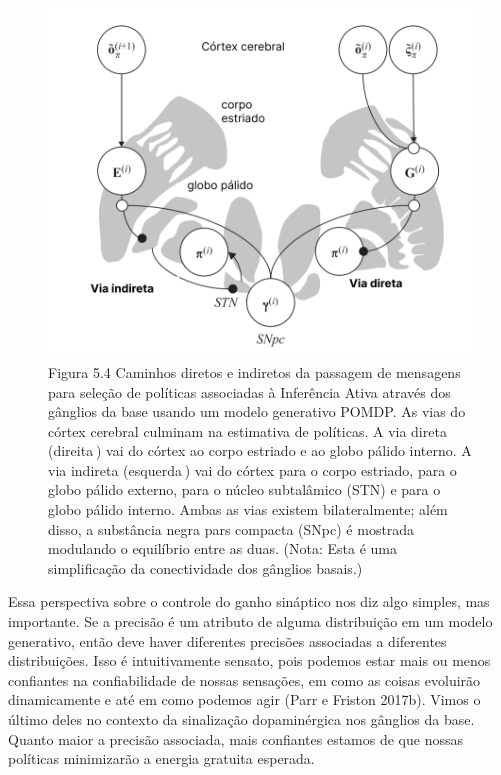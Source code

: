 \documentclass[
  12pt,
]{book}
\begin{document}
\begin{figure}
\centering
\includegraphics{images/Figura_5_4.png}
\caption{Figura 5.4 Caminhos diretos e indiretos da passagem de mensagens para seleção de políticas associadas à Inferência Ativa através dos gânglios da base usando um modelo generativo POMDP. As vias do córtex cerebral culminam na estimativa de políticas. A via direta (direita ) vai do córtex ao corpo estriado e ao globo pálido interno. A via indireta (esquerda ) vai do córtex para o corpo estriado, para o globo pálido externo, para o núcleo subtalâmico (STN) e para o globo pálido interno. Ambas as vias existem bilateralmente; além disso, a substância negra pars compacta (SNpc) é mostrada modulando o equilíbrio entre as duas. (Nota: Esta é uma simplificação da conectividade dos gânglios basais.)}
\end{figure}

Essa perspectiva sobre o controle do ganho sináptico nos diz algo simples, mas importante. Se a precisão é um atributo de alguma distribuição em um modelo generativo, então deve haver diferentes precisões associadas a diferentes distribuições. Isso é intuitivamente sensato, pois podemos estar mais ou menos confiantes na confiabilidade de nossas sensações, em como as coisas evoluirão dinamicamente e até em como podemos agir (Parr e Friston 2017b). Vimos o último deles no contexto da sinalização dopaminérgica nos gânglios da base. Quanto maior a precisão associada, mais confiantes estamos de que nossas políticas minimizarão a energia gratuita esperada.
\end{document}
